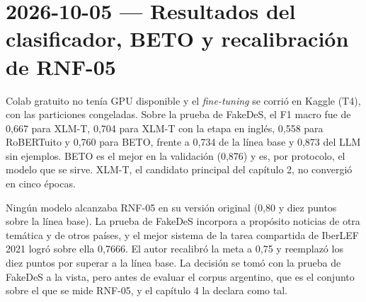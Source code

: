 \section{2026-10-05 — Resultados del clasificador, BETO y recalibración de RNF-05}

Colab gratuito no tenía GPU disponible y el \textit{fine-tuning} se corrió en Kaggle (T4), con las particiones congeladas. Sobre la prueba de FakeDeS, el F1 macro fue de 0,667 para XLM-T, 0,704 para XLM-T con la etapa en inglés, 0,558 para RoBERTuito y 0,760 para BETO, frente a 0,734 de la línea base y 0,873 del LLM sin ejemplos. BETO es el mejor en la validación (0,876) y es, por protocolo, el modelo que se sirve. XLM-T, el candidato principal del capítulo 2, no convergió en cinco épocas.

Ningún modelo alcanzaba RNF-05 en su versión original (0,80 y diez puntos sobre la línea base). La prueba de FakeDeS incorpora a propósito noticias de otra temática y de otros países, y el mejor sistema de la tarea compartida de IberLEF 2021 logró sobre ella 0,7666. El autor recalibró la meta a 0,75 y reemplazó los diez puntos por superar a la línea base. La decisión se tomó con la prueba de FakeDeS a la vista, pero antes de evaluar el corpus argentino, que es el conjunto sobre el que se mide RNF-05, y el capítulo 4 la declara como tal.

\bigskip
